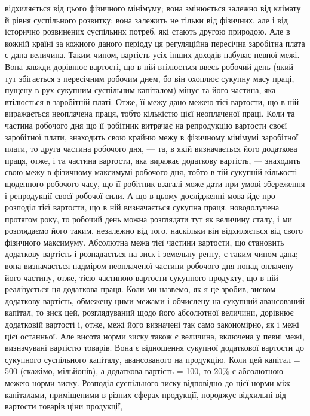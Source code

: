 відхиляється від цього фізичного мінімуму; вона змінюється залежно від клімату
й рівня суспільного розвитку; вона залежить не тільки від фізичних, але
і від історично розвинених суспільних потреб, які стають другою природою.
Але в кожній країні за кожного даного періоду ця регуляційна пересічна заробітна
плата є дана величина. Таким чином, вартість усіх інших доходів набуває
певної межі. Вона завжди дорівнює вартості, що в ній втілюється ввесь
робочий день (який тут збігається з пересічним робочим днем, бо він охоплює
сукупну масу праці, пущену в рух сукупним суспільним капіталом) мінус та
його частина, яка втілюється в заробітній платі. Отже, її межу дано межею
тієї вартости, що в ній виражається неоплачена праця, тобто кількістю цієї
неоплаченої праці. Коли та частина робочого дня що її робітник витрачає на
репродукцію вартости своєї заробітної плати, знаходить свою крайню межу
в фізичному мінімумі заробітної плати, то друга частина робочого дня, — та,
в якій визначається його додаткова праця, отже, і та частина вартости, яка
виражає додаткову вартість, — знаходить свою межу в фізичному максимумі
робочого дня, тобто в тій сукупній кількості щоденного робочого часу, що
її робітник взагалі може дати при умові збереження і репродукції своєї робочої
сили. А що в цьому дослідженні мова йде про розподіл тієї вартости, що
в ній визначається сукупна праця, новодолучена протягом року, то робочий
день можна розглядати тут як величину сталу, і ми розглядаємо його таким,
незалежно від того, наскільки він відхиляється від свого фізичного максимуму.
Абсолютна межа тієї частини вартости, що становить додаткову вартість і
розпадається на зиск і земельну ренту, є таким чином дана; вона визначається
надміром неоплаченої частини робочого дня понад оплачену його
частину, отже, тією частиною вартости сукупного продукту, що в ній реалізується
ця додаткова праця. Коли ми назвемо, як я це зробив, зиском додаткову
вартість, обмежену цими межами і обчислену на сукупний авансований
капітал, то зиск цей, розглядуваний щодо його абсолютної величини, дорівнює
додатковій вартості і, отже, межі його визначені так само закономірно,
як і межі цієї останньої. Але висота норми зиску також є величина,
включена у певні межі, визначувані вартістю товарів. Вона є відношення
сукупної додаткової вартости до сукупного суспільного капіталу, авансованого
на продукцію. Коли цей капітал = 500 (скажімо, мільйонів), а додаткова
вартість = 100, то 20\% є абсолютною межею норми зиску. Розподіл
суспільного зиску відповідно до цієї норми між капіталами, приміщеними в різних
сферах продукції, породжує відхильні від вартости товарів ціни продукції,
